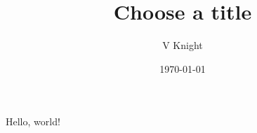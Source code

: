 \documentclass{article} %
\title{Choose a title}
\author{V Knight}
\date{\today}
\begin{document}

\maketitle

Hello, world!
\end{document}
